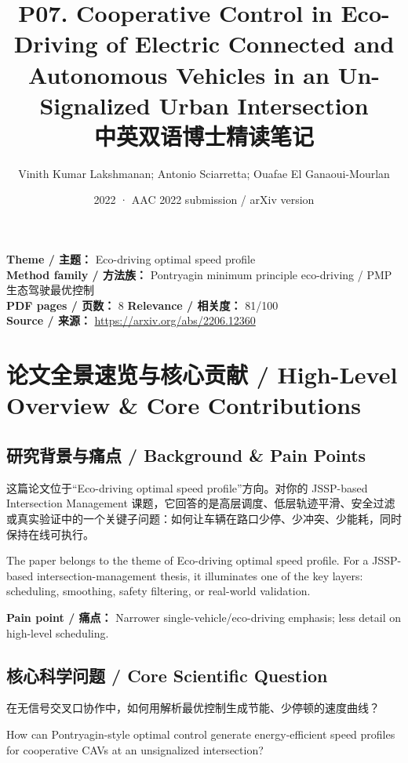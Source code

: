 \documentclass[UTF8,a4paper,11pt,fontset=fandol]{ctexart}
\title{P07. Cooperative Control in Eco-Driving of Electric Connected and Autonomous Vehicles in an Un-Signalized Urban Intersection\\中英双语博士精读笔记}
\author{Vinith Kumar Lakshmanan; Antonio Sciarretta; Ouafae El Ganaoui-Mourlan}
\date{2022 · AAC 2022 submission / arXiv version}
\begin{document}
\maketitle

\noindent\textbf{Theme / 主题：} Eco-driving optimal speed profile\\
\textbf{Method family / 方法族：} Pontryagin minimum principle eco-driving / PMP 生态驾驶最优控制\\
\textbf{PDF pages / 页数：} 8 \quad
\textbf{Relevance / 相关度：} 81/100\\
\textbf{Source / 来源：} \url{https://arxiv.org/abs/2206.12360}

\section{论文全景速览与核心贡献 / High-Level Overview \& Core Contributions}
\subsection{研究背景与痛点 / Background \& Pain Points}
这篇论文位于“Eco-driving optimal speed profile”方向。对你的 JSSP-based Intersection Management 课题，它回答的是高层调度、低层轨迹平滑、安全过滤或真实验证中的一个关键子问题：如何让车辆在路口少停、少冲突、少能耗，同时保持在线可执行。

The paper belongs to the theme of Eco-driving optimal speed profile. For a JSSP-based intersection-management thesis, it illuminates one of the key layers: scheduling, smoothing, safety filtering, or real-world validation.

\textbf{Pain point / 痛点：} Narrower single-vehicle/eco-driving emphasis; less detail on high-level scheduling.

\subsection{核心科学问题 / Core Scientific Question}
在无信号交叉口协作中，如何用解析最优控制生成节能、少停顿的速度曲线？

How can Pontryagin-style optimal control generate energy-efficient speed profiles for cooperative CAVs at an unsignalized intersection?
\end{document}
